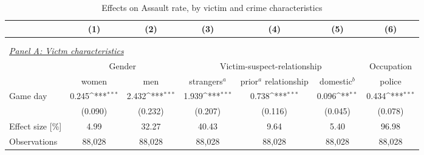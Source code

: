 

\begin{table}[ht] \centering 
	\begin{threeparttable} \centering \caption{Effects on Assault rate, by victim and crime characteristics}
		\label{tab_soc_ext:reg_fe_assrate_victim_chars}
		{\def\sym#1{\ifmmode^{#1}\else\(^{#1}\)\fi} 
			\begin{tabular}{l*{6}{c}}
				\toprule 
				&\multicolumn{1}{c}{(1)}&\multicolumn{1}{c}{(2)}&\multicolumn{1}{c}{(3)}&\multicolumn{1}{c}{(4)}&\multicolumn{1}{c}{(5)}&\multicolumn{1}{c}{(6)}\\
				\midrule

				\\\\
				\multicolumn{6}{l}{\textit{\underline{Panel A: Victm characteristics}}} \\
					& \multicolumn{2}{c}{Gender} & \multicolumn{3}{c}{Victim-suspect-relationship} & Occupation \\
					\cmidrule(lr){2-3} \cmidrule(lr){4-6} \cmidrule(lr){7-7}
				&  women & men & strangers$^a$ & \clb{c}{prior$^a$\\relationship} & domestic$^b$ & police \\
				\midrule			
				Game day           		 &     0.245\sym{***}&       2.432\sym{***}&       1.939\sym{***}&       0.738\sym{***}&       0.096\sym{**} &       0.434\sym{***}\\
				                    	 &   (0.090)         &     (0.232)         &     (0.207)         &     (0.116)         &     (0.045)         &     (0.078)         \\
				Effect size [\%]&      4.99         &       32.27         &       40.43         &        9.64         &        5.40         &       96.98         \\
				Observations        	 &    88,028         &      88,028         &      88,028         &      88,028         &      88,028         &      88,028         \\
				

\end{tabular}}
\end{threeparttable}
\end{table}
